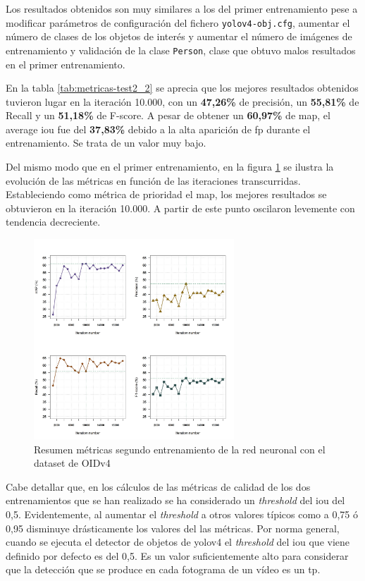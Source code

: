 Los resultados obtenidos son muy similares a los del primer entrenamiento pese a modificar parámetros de configuración del fichero \texttt{yolov4-obj.cfg}, aumentar el número de clases de los objetos de interés y aumentar el número de imágenes de entrenamiento y validación de la clase \texttt{Person}, clase que obtuvo malos resultados en el primer entrenamiento.

En la tabla \ref{tab:metricas-test2_2} se aprecia que los mejores resultados obtenidos tuvieron lugar en la iteración 10.000, con un \textbf{47,26\%} de precisión, un \textbf{55,81\%} de Recall y un \textbf{51,18\%} de F-score. A pesar de obtener un \textbf{60,97\%} de \gls{map}, el average \gls{iou} fue del \textbf{37,83\%} debido a la alta aparición de \gls{fp} durante el entrenamiento. Se trata de un valor muy bajo.

Del mismo modo que en el primer entrenamiento, en la figura \ref{fig:metrics-train2} se ilustra la evolución de las métricas en función de las iteraciones transcurridas. Estableciendo como métrica de prioridad el \gls{map}, los mejores resultados se obtuvieron en la iteración 10.000. A partir de este punto oscilaron levemente con tendencia decreciente.

\begin{figure}[ht]
\centering
\includegraphics[width=0.67\textwidth]{img/chapters/resultados/metricas/metrics-train2.png}
\caption{\label{fig:metrics-train2}Resumen métricas segundo entrenamiento de la red neuronal con el dataset de OIDv4}
\end{figure}

Cabe detallar que, en los cálculos de las métricas de calidad de los dos entrenamientos que se han realizado se ha considerado un \textit{threshold} del \gls{iou} del 0,5. Evidentemente, al aumentar el \textit{threshold} a otros valores típicos como a 0,75 ó 0,95 disminuye drásticamente los valores del las métricas. Por norma general, cuando se ejecuta el detector de objetos de \gls{yolov4} el \textit{threshold} del \gls{iou} que viene definido por defecto es del 0,5. Es un valor suficientemente alto para considerar que la detección que se produce en cada fotograma de un vídeo es un \gls{tp}.

